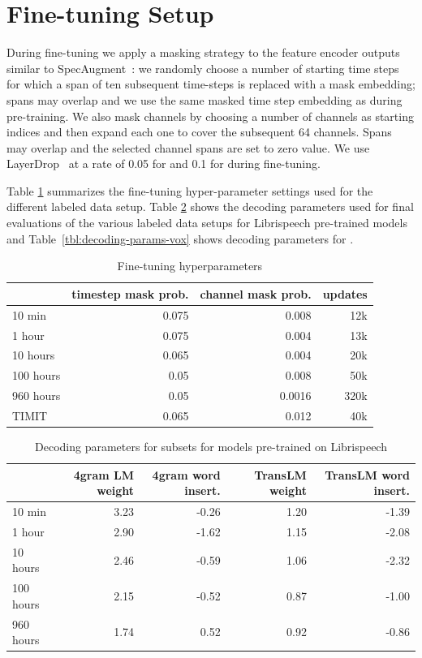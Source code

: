 \documentclass{article}
\begin{document}
\section{Fine-tuning Setup}
\label{app:finetune}

During fine-tuning we apply a masking strategy to the feature encoder outputs similar to SpecAugment~\citep{park2019specaugment}:
we randomly choose a number of starting time steps for which a span of ten subsequent time-steps is replaced with a mask embedding; spans may overlap and we use the same masked time step embedding as during pre-training. 
We also mask channels by choosing a number of channels as starting indices and then expand each one to cover the subsequent 64 channels.
Spans may overlap and the selected channel spans are set to zero value.
We use LayerDrop~\citep{huang2016deep,fan2019reducing} at a rate of 0.05 for \wvppbase{} and 0.1 for \wvppbig{} during fine-tuning.

Table \ref{tbl:fine-tuning} summarizes the fine-tuning hyper-parameter settings used for the different labeled data setup.
Table \ref{tbl:decoding-params-libri} shows the decoding parameters used for final evaluations of the various labeled data setups for Librispeech pre-trained models and Table~\ref{tbl:decoding-params-vox} shows decoding parameters for \vox{}.

\begin{table}[ht!]
\caption{%
Fine-tuning hyperparameters
}
\label{tbl:fine-tuning}
\centering 
\begin{tabular}{lrrr}
\toprule
{} & timestep mask prob. & channel mask prob. & updates \\
\midrule
10 min & 0.075 & 0.008 & 12k \\
1 hour & 0.075 & 0.004 & 13k \\
10 hours & 0.065 & 0.004 & 20k \\
100 hours & 0.05 & 0.008 & 50k \\
960 hours & 0.05 & 0.0016 & 320k \\
TIMIT & 0.065 & 0.012 & 40k \\
\bottomrule
\end{tabular}
\end{table}

\begin{table}[ht!]
\caption{%
Decoding parameters for \libri{} subsets for models pre-trained on Librispeech
}
\label{tbl:decoding-params-libri}
\centering 
\begin{tabular}{lrrrr}
\toprule
{} & 4gram LM weight & 4gram word insert. & TransLM weight & TransLM word insert. \\
\midrule
10 min & 3.23 & -0.26 & 1.20 & -1.39 \\
1 hour & 2.90 & -1.62 & 1.15 & -2.08 \\
10 hours & 2.46 & -0.59  & 1.06 & -2.32 \\
100 hours & 2.15 & -0.52 & 0.87 & -1.00 \\
960 hours & 1.74 & 0.52 & 0.92 & -0.86 \\
\bottomrule
\end{tabular}
\end{table}
\end{document}
